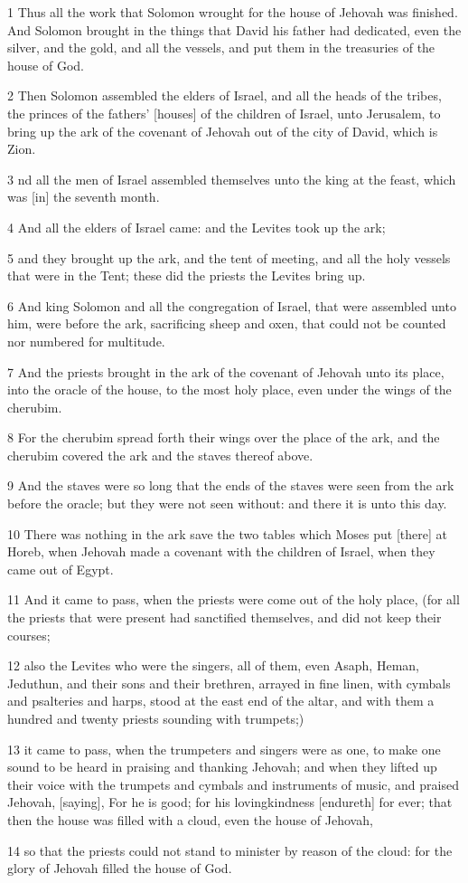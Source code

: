 \par 1 Thus all the work that Solomon wrought for the house of Jehovah was finished. And Solomon brought in the things that David his father had dedicated, even the silver, and the gold, and all the vessels, and put them in the treasuries of the house of God.
\par 2 Then Solomon assembled the elders of Israel, and all the heads of the tribes, the princes of the fathers' [houses] of the children of Israel, unto Jerusalem, to bring up the ark of the covenant of Jehovah out of the city of David, which is Zion.
\par 3 nd all the men of Israel assembled themselves unto the king at the feast, which was [in] the seventh month.
\par 4 And all the elders of Israel came: and the Levites took up the ark;
\par 5 and they brought up the ark, and the tent of meeting, and all the holy vessels that were in the Tent; these did the priests the Levites bring up.
\par 6 And king Solomon and all the congregation of Israel, that were assembled unto him, were before the ark, sacrificing sheep and oxen, that could not be counted nor numbered for multitude.
\par 7 And the priests brought in the ark of the covenant of Jehovah unto its place, into the oracle of the house, to the most holy place, even under the wings of the cherubim.
\par 8 For the cherubim spread forth their wings over the place of the ark, and the cherubim covered the ark and the staves thereof above.
\par 9 And the staves were so long that the ends of the staves were seen from the ark before the oracle; but they were not seen without: and there it is unto this day.
\par 10 There was nothing in the ark save the two tables which Moses put [there] at Horeb, when Jehovah made a covenant with the children of Israel, when they came out of Egypt.
\par 11 And it came to pass, when the priests were come out of the holy place, (for all the priests that were present had sanctified themselves, and did not keep their courses;
\par 12 also the Levites who were the singers, all of them, even Asaph, Heman, Jeduthun, and their sons and their brethren, arrayed in fine linen, with cymbals and psalteries and harps, stood at the east end of the altar, and with them a hundred and twenty priests sounding with trumpets;)
\par 13 it came to pass, when the trumpeters and singers were as one, to make one sound to be heard in praising and thanking Jehovah; and when they lifted up their voice with the trumpets and cymbals and instruments of music, and praised Jehovah, [saying], For he is good; for his lovingkindness [endureth] for ever; that then the house was filled with a cloud, even the house of Jehovah,
\par 14 so that the priests could not stand to minister by reason of the cloud: for the glory of Jehovah filled the house of God.

